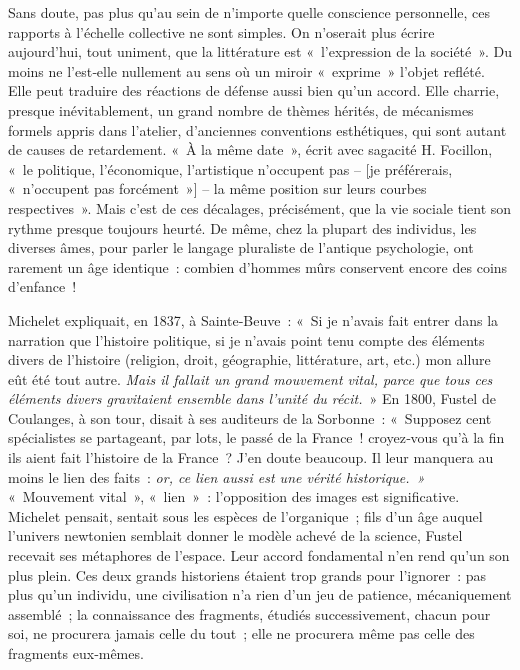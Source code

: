 \documentclass[french,twoside]{book} %
\begin{document}
Sans doute, pas plus qu’au sein de n’importe quelle conscience person­nelle, ces rapports à l’échelle collective ne sont simples. On n’oserait plus écrire aujourd’hui, tout uniment, que la littérature est « l’expression de la société ». Du moins ne l’est‑elle nullement au sens où un miroir « ex­prime » l’objet reflété. Elle peut traduire des réactions de défense aussi bien qu’un accord. Elle charrie, presque inévitablement, un grand nombre de thèmes hérités, de mécanismes formels appris dans l’atelier,  
\label{p78} d’anciennes conventions esthétiques, qui sont autant de causes de retarde­ment. « À la même date », écrit avec sagacité H. Focillon, « le politique, l’économique, l’artistique n’occupent pas – [je préférerais, « n’occupent pas forcément »] – la même position sur leurs courbes respectives ». Mais c’est de ces décalages, précisément, que la vie sociale tient son rythme presque toujours heurté. De même, chez la plupart des individus, les diverses âmes, pour parler le langage pluraliste de l’antique psychologie, ont rarement un âge identique : combien d’hommes mûrs conservent encore des coins d’enfance !\par
Michelet expliquait, en 1837, à Sainte‑Beuve : « Si je n’avais fait entrer dans la narration que l’histoire politique, si je n’avais point tenu compte des éléments divers de l’histoire (religion, droit, géographie, littérature, art, etc.) mon allure eût été tout autre. \emph{Mais il fallait un grand mou­vement vital, parce que tous ces éléments divers gravitaient ensemble dans l’unité du récit.} » En 1800, Fustel de Coulanges, à son tour, disait à ses auditeurs de la Sorbonne : « Supposez cent spécialistes se partageant, par lots, le passé de la France ! croyez‑vous qu’à la fin ils aient fait l’his­toire de la France ? J’en doute beaucoup. Il leur manquera au moins le lien des faits : \emph{or, ce lien aussi est une vérité historique. »} « Mouvement vital », « lien » : l’opposition des images est significative. Michelet pensait, sentait sous les espèces de l’organique ; fils d’un âge auquel l’univers newtonien semblait donner le modèle achevé de la science, Fustel recevait ses métaphores de l’espace. Leur accord fondamental n’en rend qu’un son plus plein. Ces deux grands historiens étaient trop grands pour l’ignorer : pas plus qu’un individu, une civilisation n’a rien d’un jeu de patience, mécaniquement assemblé ; la connaissance des fragments, étudiés suc­cessivement, chacun pour soi, ne procurera jamais celle du tout ; elle ne procurera même pas celle des fragments eux‑mêmes.\par
\end{document}

